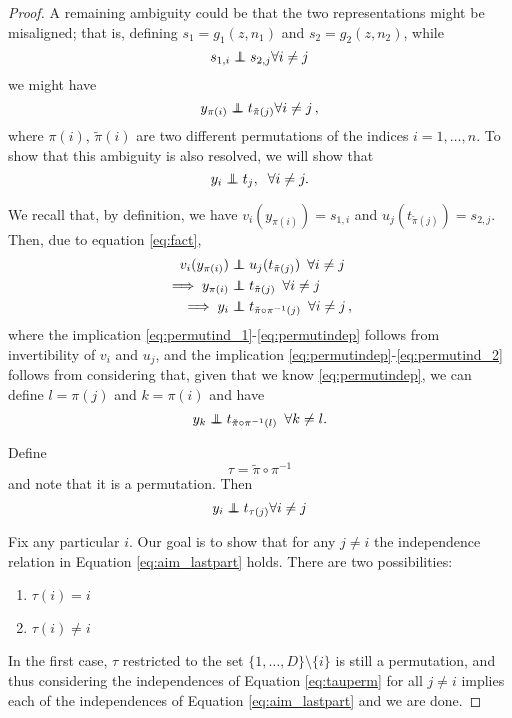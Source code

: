\begin{proof}
A remaining ambiguity could be that the two representations might be misaligned; that is, defining ${s}_1={g}_1({z}, {n}_1)$ and ${s}_2={g}_2({z}, {n}_2)$, while
	\begin{equation}
	s_{1,i} \independent s_{2,j} \forall i \neq j \label{eq:fact}
	\end{equation}
	we might have
	\[
	y_{\pi(i)} \independent t_{\tilde{\pi}(j)} \forall i \neq j\,,
	\]
	where $\pi(i)$, $\tilde{\pi}(i)$ are two different permutations of the indices $i=1, \ldots, n$. 
To show that this ambiguity is also resolved, we will show that
	\begin{equation}
	y_{i} \independent t_{j},\;\;\forall i \neq j. \label{eq:aim_lastpart}
	\end{equation}
	
	
	We recall that, by definition, we have $v_i(y_{\pi(i)}) = s_{1,i}$ and $u_j(t_{\tilde{\pi}(j)}) = s_{2,j}$. Then, due to equation \ref{eq:fact},
	\begin{align}
	v_i(y_{\pi(i)}) & \independent u_j(t_{\tilde{\pi}(j)}) \,\,\, \forall i \neq j \label{eq:permutind_1}\\
	\implies y_{\pi(i)} & \independent t_{\tilde{\pi}(j)} \,\,\, \forall i \neq j \label{eq:permutindep}\\
	\implies y_{i} & \independent t_{\tilde{\pi}\circ \pi^{-1} (j)} \,\,\, \forall i \neq j\,, \label{eq:permutind_2}
	\end{align}
	where the implication \ref{eq:permutind_1}-\ref{eq:permutindep} follows from invertibility of $v_i$ and $u_j$, and the implication \ref{eq:permutindep}-\ref{eq:permutind_2} follows from considering that, given that we know \ref{eq:permutindep}, we can define $l=\pi(j)$ and $k=\pi(i)$ and have
	\[
	y_{k}  \independent t_{\tilde{\pi} \circ \pi^{-1} (l)} \,\,\, \forall k \neq l.
	\]
	
	Define
	\[
	\tau = \tilde{\pi} \circ \pi^{-1}
	\]
	and note that it is a permutation. Then
	\begin{equation}
	y_i \independent t_{\tau(j)}  \forall i \neq j \label{eq:tauperm}
	\end{equation}
	
	Fix any particular $i$.
	Our goal is to show that for any $j\not= i$ the independence relation in Equation \ref{eq:aim_lastpart} holds.
	There are two possibilities:
	\begin{enumerate}
		\item $\tau(i)=i$
		\item $\tau(i)\neq i$
	\end{enumerate}
	In the first case, $\tau$ restricted to the set $\{1,\ldots,D\}\setminus\{i\}$ is still a permutation, and thus considering the independences of Equation \ref{eq:tauperm} for all $j\not= i$ implies each of the independences of Equation \ref{eq:aim_lastpart} and we are done.
	

\end{proof}
